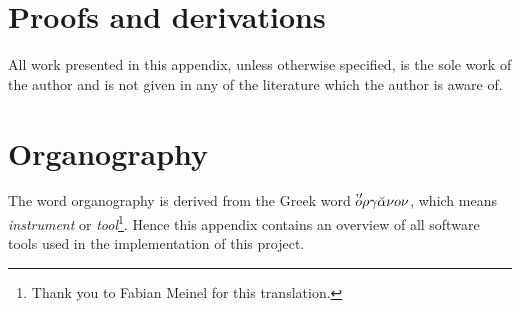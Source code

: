 \documentclass{report}
\begin{document}




\begin{appendix}
\chapter{Proofs and derivations}
All work presented in this appendix, unless otherwise specified, is the sole work
of the author and is not given in any of the literature which the author is aware of.



\chapter*{Organography}
The word organography is derived from the Greek word
$\mbox{\makebox[0pt]{\raisebox{1.5pt}{\hspace{5.5pt}'$'$}}} o\rho\gamma\breve{\alpha}\nu o\nu$,
which means \emph{instrument} or \emph{tool}\footnote{Thank you to Fabian Meinel for this
translation.}. Hence this appendix contains an overview of all software tools used in the
implementation of this project.
\end{appendix}

\end{document}
